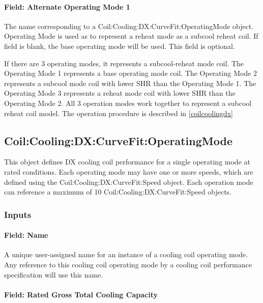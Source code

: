 \paragraph{Field: Alternate Operating Mode 1}\label{field-alternate-operating-mode-2}

The name corresponding to a Coil:Cooling:DX:CurveFit:OperatingMode object. Operating Mode is used as to represent a reheat mode as a subcool reheat coil. If field is blank, the base operating mode will be used. This field is optional.

If there are 3 operating modes, it represents a subcool-reheat mode coil. The Operating Mode 1 represents a base operating mode coil. The Operating Mode 2 represents a subcool mode coil with lower SHR than the Operating Mode 1. The Operating Mode 3 represents a reheat mode coil with lower SHR than the Operating Mode 2. All 3 operation modes work together to represent a subcool reheat coil model. The operation procedure is described in \ref{coilcoolingdx}

\subsection{Coil:Cooling:DX:CurveFit:OperatingMode}\label{coilcoolingdxcurvefitoperatingmode}

This object defines DX cooling coil performance for a single operating mode at rated conditions. Each operating mode may have one or more speeds, which are defined using the Coil:Cooling:DX:CurveFit:Speed object. Each operation mode can reference a maximum of 10 Coil:Cooling:DX:CurveFit:Speed objects.

\subsubsection{Inputs}\label{inputs-03}

\paragraph{Field: Name}\label{field-name-03}

A unique user-assigned name for an instance of a cooling coil operating mode. Any reference to this cooling coil operating mode by a cooling coil performance specification will use this name.

\paragraph{Field: Rated Gross Total Cooling Capacity}\label{field-rated-gross-total-cooling-capacity-1}

